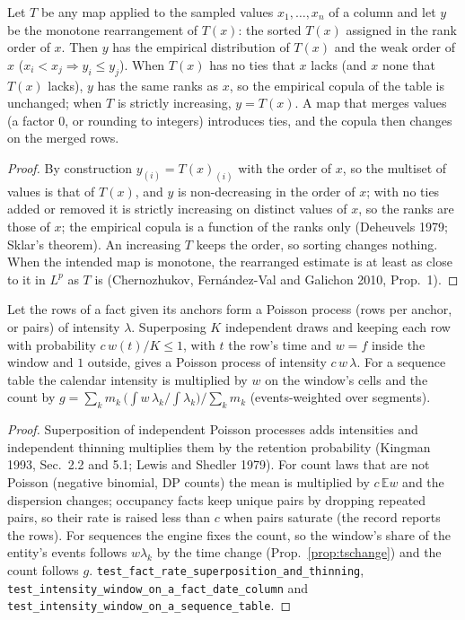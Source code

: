 \begin{proposition}\label{prop:simmap}
Let $T$ be any map applied to the sampled values $x_1,\dots,x_n$ of a column and let $y$ be the monotone rearrangement
of $T(x)$: the sorted $T(x)$ assigned in the rank order of $x$. Then $y$ has the empirical distribution of $T(x)$ and
the weak order of $x$ ($x_i<x_j\Rightarrow y_i\le y_j$). When $T(x)$ has no ties that $x$ lacks (and $x$ none that
$T(x)$ lacks), $y$ has the same ranks as $x$, so the empirical copula of the table is unchanged; when $T$ is strictly
increasing, $y=T(x)$. A map that merges values (a factor $0$, or rounding to integers) introduces ties, and the
copula then changes on the merged rows.
\end{proposition}
\begin{proof}
By construction $y_{(i)}=T(x)_{(i)}$ with the order of $x$, so the multiset of values is that of $T(x)$, and
$y$ is non-decreasing in the order of $x$; with no ties added or removed it is strictly increasing on distinct values of
$x$, so the ranks are those of $x$; the empirical copula is a function of the ranks only (Deheuvels 1979; Sklar's theorem). An
increasing $T$ keeps the order, so sorting changes nothing. When the intended map is monotone, the rearranged estimate is
at least as close to it in $L^p$ as $T$ is (Chernozhukov, Fern\'andez-Val and Galichon 2010, Prop.~1).
\end{proof}

\begin{proposition}\label{prop:simrate}
Let the rows of a fact given its anchors form a Poisson process (rows per anchor, or pairs) of intensity $\lambda$.
Superposing $K$ independent draws and keeping each row with probability $c\,w(t)/K\le1$, with $t$ the row's time and
$w=f$ inside the window and $1$ outside, gives a Poisson process of intensity $c\,w\,\lambda$. For a sequence table the
calendar intensity is multiplied by $w$ on the window's cells and the count by
$g=\sum_k m_k\,\bigl(\int w\,\lambda_k/\int\lambda_k\bigr)/\sum_km_k$ (events-weighted over segments).
\end{proposition}
\begin{proof}
Superposition of independent Poisson processes adds intensities and independent thinning multiplies them by the
retention probability (Kingman 1993, Sec.~2.2 and 5.1; Lewis and Shedler 1979). For count laws that are not Poisson
(negative binomial, DP counts) the mean is multiplied by $c\,\mathbb E w$ and the dispersion changes; occupancy facts
keep unique pairs by dropping repeated pairs, so their rate is raised less than $c$ when pairs saturate (the record
reports the rows). For sequences the engine fixes the count, so the window's share of the entity's events follows
$w\lambda_k$ by the time change (Prop.~\ref{prop:tschange}) and the count follows $g$.
\texttt{test\_fact\_rate\_superposition\_and\_thinning}, \texttt{test\_intensity\_window\_on\_a\_fact\_date\_column}
and \texttt{test\_intensity\_window\_on\_a\_sequence\_table}.
\end{proof}

